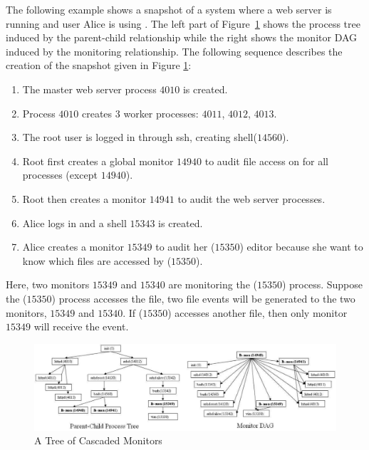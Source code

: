 The following example shows a snapshot of a system where a web server is running
and user Alice is using .
The left part of Figure~\ref{mon-tree} shows the process tree induced
by the parent-child relationship while the right
shows the monitor DAG induced by the monitoring relationship.
The following sequence describes the creation of the snapshot given
in Figure \ref{mon-tree}:

\begin{enumerate}
\item The master web server process $4010$ is created.
\item Process $4010$ creates 3 worker processes:
$4011$, $4012$, $4013$.
\item The root user is logged in through ssh, creating shell($14560$).
\item Root first creates a global monitor $14940$ to audit
file access on  for all processes (except $14940$).
\item Root then creates a monitor $14941$ to audit the web server processes.
\item Alice logs in and a shell $15343$ is created.
\item Alice creates a monitor $15349$ to audit her ($15350$) editor
because she want to know which files are accessed by ($15350$).
\end{enumerate}

Here, two monitors $15349$ and $15340$ are monitoring the
($15350$) process. 
Suppose the  ($15350$) 
process accesses the  file, 
two file events will be generated to the two monitors, $15349$ and $15340$.
If  ($15350$) accesses another file, then only
monitor $15349$ will receive the event.

\begin{figure}
\includegraphics[scale=0.4]{lbox/mon-both}
\caption{A Tree of Cascaded Monitors}
\label{mon-tree}
\end{figure}


